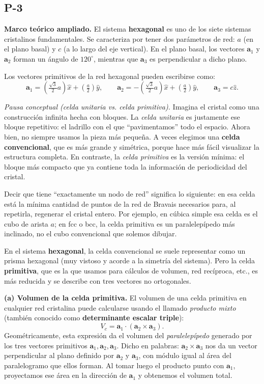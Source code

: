 \documentclass{article}
\begin{document}
\subsection{P-3}

\textbf{Marco teórico ampliado.}  
El sistema \textbf{hexagonal} es uno de los siete sistemas cristalinos fundamentales. Se caracteriza por tener dos parámetros de red: \(a\) (en el plano basal) y \(c\) (a lo largo del eje vertical). En el plano basal, los vectores \(\mathbf{a}_1\) y \(\mathbf{a}_2\) forman un ángulo de \(120^\circ\), mientras que \(\mathbf{a}_3\) es perpendicular a dicho plano.  

Los vectores primitivos de la red hexagonal pueden escribirse como:
\[
\mathbf{a}_1 = \left(\tfrac{\sqrt{3}}{2}a\right)\hat{x} + \left(\tfrac{a}{2}\right)\hat{y}, 
\qquad
\mathbf{a}_2 = -\left(\tfrac{\sqrt{3}}{2}a\right)\hat{x} + \left(\tfrac{a}{2}\right)\hat{y}, 
\qquad
\mathbf{a}_3 = c \hat{z}.
\]

\medskip
\noindent\textit{Pausa conceptual (celda unitaria vs. celda primitiva).}  
Imagina el cristal como una construcción infinita hecha con bloques.  
La \emph{celda unitaria} es justamente ese bloque repetitivo: el ladrillo con el que “pavimentamos” todo el espacio.  
Ahora bien, no siempre usamos la pieza más pequeña. A veces elegimos una \textbf{celda convencional}, que es más grande y simétrica, porque hace más fácil visualizar la estructura completa.  
En contraste, la \emph{celda primitiva} es la versión mínima: el bloque más compacto que ya contiene toda la información de periodicidad del cristal.  

Decir que tiene “exactamente un nodo de red” significa lo siguiente: en esa celda está la mínima cantidad de puntos de la red de Bravais necesarios para, al repetirla, regenerar el cristal entero.  
Por ejemplo, en cúbica simple esa celda es el cubo de arista $a$; en fcc o bcc, la celda primitiva es un paralelepípedo más inclinado, no el cubo convencional que solemos dibujar.  

En el sistema \textbf{hexagonal}, la celda convencional se suele representar como un prisma hexagonal (muy vistoso y acorde a la simetría del sistema).  
Pero la celda \textbf{primitiva}, que es la que usamos para cálculos de volumen, red recíproca, etc., es más reducida y se describe con tres vectores no ortogonales.  


\bigskip
\textbf{(a) Volumen de la celda primitiva.}  
El volumen de una celda primitiva en cualquier red cristalina puede calcularse usando el llamado 
\emph{producto mixto} (también conocido como \textbf{determinante escalar triple}):
\[
V_c = \mathbf{a}_1 \cdot (\mathbf{a}_2 \times \mathbf{a}_3).
\]
Geométricamente, esta expresión da el volumen del \emph{paralelepípedo} generado por los tres vectores primitivos 
$\mathbf{a}_1, \mathbf{a}_2, \mathbf{a}_3$.  
Dicho en palabras: $\mathbf{a}_2 \times \mathbf{a}_3$ nos da un vector perpendicular al plano 
definido por $\mathbf{a}_2$ y $\mathbf{a}_3$, con módulo igual al área del paralelogramo que ellos forman.  
Al tomar luego el producto punto con $\mathbf{a}_1$, proyectamos ese área en la dirección de $\mathbf{a}_1$ 
y obtenemos el volumen total.  
\end{document}

